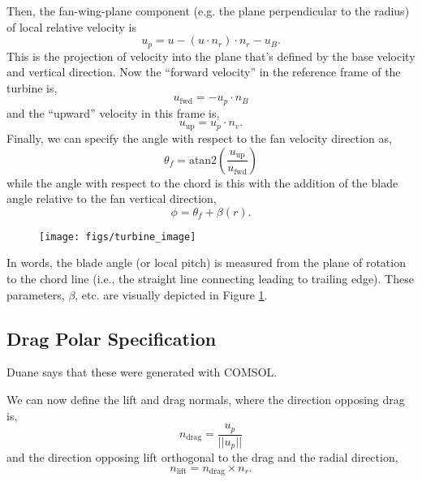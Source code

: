Then, the fan-wing-plane component (e.g. the plane perpendicular to the 
radius) of local relative velocity is
\begin{equation}
u_p = u - (u\cdot n_r)\cdot n_r - u_B. 
\end{equation}
This is the projection of velocity into the plane that's defined by the
base velocity and vertical direction. 
Now the ``forward velocity'' in the reference frame of the turbine is, 
\begin{equation}
u_{\text{fwd}}= -u_p \cdot n_B
\end{equation}
and the ``upward'' velocity in this frame is, 
\begin{equation}
u_{\text{up}} = u_p \cdot n_v. 
\end{equation}
Finally, we can specify the angle with respect to the fan velocity
direction as, 
\begin{equation}
 \theta_f = \text{atan2}\left(\frac{u_{\text{up}}}{u_{\text{fwd}}}\right)
\end{equation}
while the angle with respect to the chord is this with the addition of
the blade angle relative to the fan vertical direction, 
\begin{equation}
 \phi = \theta_f + \beta(r).
\end{equation}

  \begin{figure}[!htb]
    \begin{center}
     \texttt{[image: figs/turbine\_image]}
     \caption{}
     \label{fig:turbine_image}
    \end{center}
  \end{figure}

In words, the blade angle (or local pitch) is measured from the plane of
rotation to the chord line (i.e., the straight line connecting leading
to trailing edge). These parameters, $\beta$, etc. are visually depicted
in Figure \ref{fig:turbine_image}.  


\subsection{Drag Polar Specification}

Duane says that these were generated with COMSOL.

We can now define the lift and drag
normals, where the direction opposing drag is, 
\begin{equation}
n_{\text{drag}} = \frac{u_p}{||u_p||} 
\end{equation}
and the direction opposing lift orthogonal to the drag and the radial
direction,  
\begin{equation}
n_{\text{lift}}= n_{\text{drag}} \times n_r. 
\end{equation}

